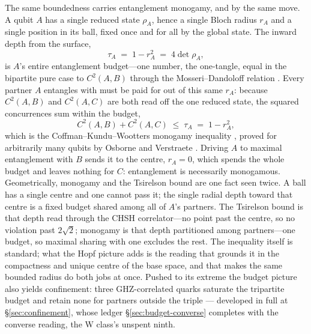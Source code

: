 \noindent
The same boundedness carries entanglement monogamy, and by the same
move. A qubit $A$ has a single reduced state $\rho_{A}$, hence a single Bloch
radius $r_{A}$ and a single position in its ball, fixed once and for all by the
global state. The inward depth from the surface,
\begin{equation}
  \tau_{A} \;=\; 1 - r_{A}^{2} \;=\; 4\det\rho_{A},
\end{equation}
is $A$'s entire entanglement budget---one number, the one-tangle, equal in the
bipartite pure case to $C^{2}(A,B)$ through the Mosseri--Dandoloff relation
\autocite{mosseri2001hopf}. Every partner $A$ entangles with must be paid
for out of this same $r_{A}$: because $C^{2}(A,B)$ and $C^{2}(A,C)$ are both read
off the one reduced state, the squared concurrences sum within the budget,
\begin{equation}
  C^{2}(A,B) + C^{2}(A,C) \;\le\; \tau_{A} \;=\; 1 - r_{A}^{2},
\end{equation}
which is the Coffman--Kundu--Wootters monogamy inequality
\autocite{coffmankunduwootters2000}, proved for arbitrarily many qubits by Osborne and
Verstraete \autocite{osborneverstraete2006}. Driving $A$ to maximal entanglement with $B$
sends it to the centre, $r_{A}=0$, which spends the whole budget and leaves
nothing for $C$: entanglement is necessarily monogamous. Geometrically, monogamy
and the Tsirelson bound are one fact seen twice. A ball has a single centre and
one cannot pass it; the single radial depth toward that centre is a fixed budget
shared among all of $A$'s partners. The Tsirelson bound is that depth read
through the CHSH correlator---no point past the centre, so no violation past
$2\sqrt{2}$; monogamy is that depth partitioned among partners---one budget, so
maximal sharing with one excludes the rest. The inequality itself is standard;
what the Hopf picture adds is the reading that grounds it in the compactness and
unique centre of the base space, and that makes the same bounded radius do both
jobs at once. Pushed to its extreme the budget picture also yields confinement:
three GHZ-correlated quarks saturate the tripartite budget and retain none for partners outside
the triple --- developed in full at \S\ref{sec:confinement}, whose ledger
\S\ref{sec:budget-converse} completes with the converse reading, the W class's unspent ninth.
